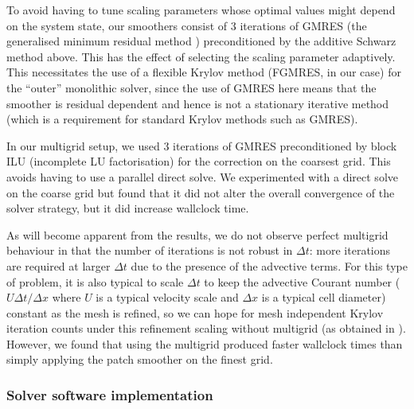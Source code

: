 \documentclass[a4paper, 12pt]{article}
\newcommand{\revisedus}[1]{#1}
\begin{document}
To avoid having to tune scaling parameters whose optimal values might
depend on the system state, our smoothers consist of \revisedus{3}
iterations of GMRES \revisedus{(the generalised minimum residual
  method \citep{saad1986gmres})} preconditioned by the additive
Schwarz method above. This has the effect of selecting the scaling
parameter adaptively.  This necessitates the use of a flexible Krylov
method (FGMRES, in our case) for the ``outer'' monolithic solver,
since the use of GMRES here means that the smoother is residual
dependent and hence is not a stationary iterative method (which is a
requirement for standard Krylov methods such as GMRES).

In our multigrid setup, we \revisedus{used 3 iterations of GMRES
  preconditioned by block ILU (incomplete LU factorisation)} for the
correction on the coarsest grid. This avoids having to use a parallel
direct solve. We experimented with a direct solve on the coarse grid
but found that it did not alter the overall convergence of the solver
strategy\revisedus{, but it did increase wallclock time.}


As will become apparent from the results, we do not observe perfect
multigrid behaviour in that the number of iterations is not robust in
$\Delta t$: more iterations are required at larger $\Delta t$ due to
the presence of the advective terms.  For this type of problem, it is
also typical to scale $\Delta t$ to keep the advective Courant number
($U\Delta t/\Delta x$ where $U$ is a typical velocity scale and
$\Delta x$ is a typical cell diameter) constant as the mesh is
refined, so we can hope for mesh independent Krylov iteration counts
under this refinement scaling without multigrid \revisedus{(as obtained
in \citet{cottershipton2023compatible})}.
However, we found
that using the multigrid produced faster wallclock times than
simply applying the patch smoother on the finest grid.

\subsubsection{Solver software implementation}
\end{document}
